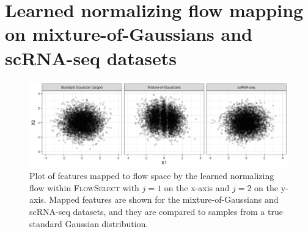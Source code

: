 \documentclass{article}
\newcommand{\FlowSelect}{\textsc{FlowSelect}\xspace}
\begin{document}
\section{Learned normalizing flow mapping on mixture-of-Gaussians and scRNA-seq datasets}
\begin{figure}[!h]
\begin{center}
        \includegraphics[width=\linewidth]{fig/flowspace.png}
\end{center}
    \caption{Plot of features mapped to flow space by the learned normalizing flow within \FlowSelect with $j=1$ on the x-axis and $j=2$ on the y-axis. Mapped features are shown for the mixture-of-Gaussians and scRNA-seq datasets, and they are compared to samples from a true standard Gaussian distribution.}
\end{figure}
\end{document}
